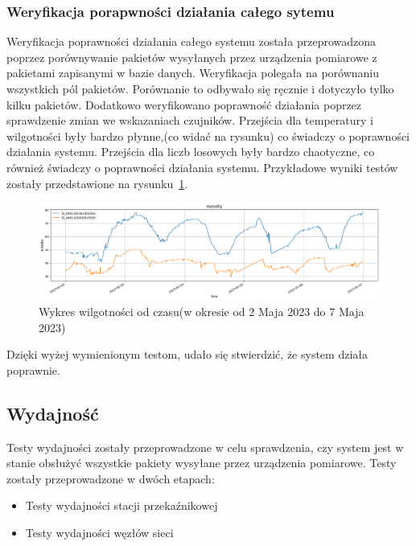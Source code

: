 \subsubsection{Weryfikacja porapwności działania całego sytemu}
Weryfikacja poprawności działania całego systemu została przeprowadzona poprzez porównywanie pakietów wysyłanych przez urządzenia pomiarowe z pakietami zapisanymi w bazie danych. Weryfikacja polegała na porównaniu wszystkich pól pakietów. Porównanie to odbywało się ręcznie i dotyczyło tylko kilku pakietów. Dodatkowo weryfikowano poprawność działania poprzez sprawdzenie zmian we wskazaniach czujników. Przejścia dla temperatury i wilgotności były bardzo płynne,(co widać na rysunku) co świadczy o poprawności działania systemu. Przejścia dla liczb losowych były bardzo chaotyczne, co również świadczy o poprawności działania systemu. Przykładowe wyniki testów zostały przedstawione na rysunku~\ref{rys:porownanie-hum}.

\begin{figure}[b!]
    \begin{center}
        \includegraphics[width=15cm]{pic/diagram-humidity.png}
    \end{center}
    \caption{Wykres wilgotności od czasu(w okresie od 2 Maja 2023 do 7 Maja 2023)}\label{rys:porownanie-hum}
\end{figure}


Dzięki wyżej wymienionym testom, udało się stwierdzić, że system działa poprawnie.

\subsection{Wydajność}
Testy wydajności zostały przeprowadzone w celu sprawdzenia, czy system jest w stanie obsłużyć wszystkie pakiety wysyłane przez urządzenia pomiarowe. Testy zostały przeprowadzone w dwóch etapach:
\begin{itemize}
    \item Testy wydajności stacji przekaźnikowej
    \item Testy wydajności węzłów sieci
\end{itemize}

